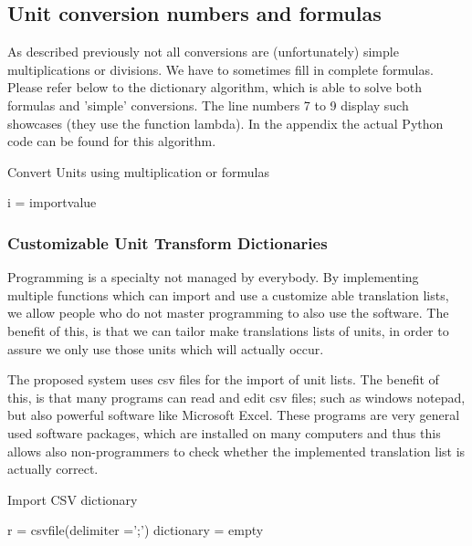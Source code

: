 \documentclass[sigchi, nonacm]{acmart}
\begin{document}


\subsection{Unit conversion numbers and formulas}
As described previously not all conversions are (unfortunately) simple multiplications or divisions. We have to sometimes fill in complete formulas. Please refer below to the dictionary algorithm, which is able to solve both formulas and 'simple' conversions. The line numbers 7 to 9 display such showcases (they use the function lambda). In the appendix the actual Python code can be found for this algorithm.

\begin{algorithm}%
\caption{Convert Units using multiplication or formulas}
\SetAlgoLined
\DontPrintSemicolon
i = importvalue\;
\end{algorithm}



\subsubsection{Customizable Unit Transform Dictionaries}
Programming is a specialty not managed by everybody. By implementing multiple functions which can import and use a customize able translation lists, we allow people who do not master programming to also use the software. The benefit of this, is that we can tailor make translations lists of units, in order to assure we only use those units which will actually occur.

The proposed system uses csv files for the import of unit lists. The benefit of this, is that many programs can read and edit csv files; such as windows notepad, but also powerful software like Microsoft Excel. These programs are very general used software packages, which are installed on many computers and thus this allows also non-programmers to check whether the implemented translation list is actually correct.



\begin{algorithm}
\caption{Import CSV dictionary}
\SetAlgoLined
\DontPrintSemicolon
    r = csvfile(delimiter =';')\;
    dictionary = empty\;
\end{algorithm}
\end{document}
